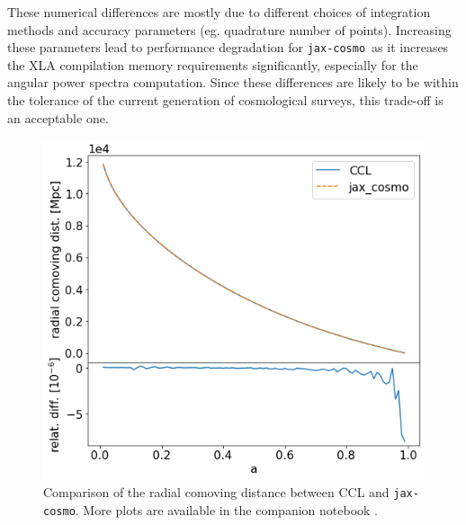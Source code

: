 \documentclass[twocolumn,twocolappendix,nofootinbib,iop]{openjournal}
\newcommand{\nblink}[1]{\href{https://github.com/DifferentiableUniverseInitiative/jax-cosmo-paper/blob/master/notebooks/#1.ipynb}{\faFileCodeO}}
\newcommand{\jaxcosmo}{\texttt{jax-cosmo}}
\begin{document}
These numerical differences are mostly due to different choices of integration methods and accuracy parameters (eg. quadrature number of points). Increasing these parameters lead to performance degradation for \jaxcosmo\ as it increases the XLA compilation memory requirements significantly, especially for the angular power spectra computation. Since these differences are likely to be within the tolerance of the current generation of cosmological surveys, this trade-off is an acceptable one.
 

\begin{figure}
    \centering
    \includegraphics[width=\columnwidth]{figures/comp_radial_com_dist.png}
    \caption{Comparison of the radial comoving distance between CCL and \jaxcosmo. More plots are available in the  companion notebook \nblink{CCL_comparison}.} 
    \label{fig:chi_comparison}
\end{figure}
\end{document}
